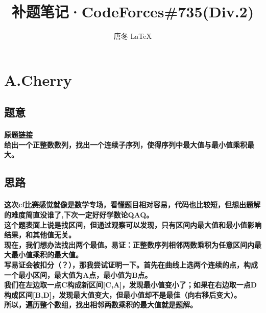 \documentclass[cyan,pad,cn]{elegantnote}
\title{
    补题笔记·CodeForces\#735(Div.2)
}
\author{唐冬   \LaTeX}
\begin{document}
\maketitle

\section{
    A.Cherry
}

\subsection{题意}
\paragraph{
    原题\href{https://codeforces.com/contest/1554/problem/A}{链接}
    \\给出一个正整数数列，找出一个连续子序列，使得序列中最大值与最小值乘积最大。
}

\subsection{思路}
\paragraph{
    这次cf比赛感觉就像是数学专场，看懂题目相对容易，代码也比较短，但想出题解的难度简直没谁了,下次一定好好学数论QAQ。
    \\这个题表面上说是找区间，但通过观察可以发现，只有区间内最大值和最小值影响结果，和其他值无关。
    \\现在，我们想办法找出两个最值。易证：正整数序列相邻两数乘积为任意区间内最大最小值乘积的最大值。
    \\写易证会被扣分（？），那我尝试证明一下。首先在曲线上选两个连续的点，构成一个最小区间，最大值为A点，最小值为B点。
    \\我们在左边取一点C构成新区间[C,A]，发现最小值变小了；如果在右边取一点D构成区间[B,D]，发现最大值变大，但最小值却不是最佳（向右移后变大）。
    \\所以，遍历整个数组，找出相邻两数乘积的最大值就是题解。\\
}
\end{document}

